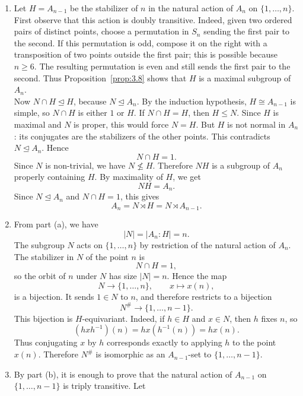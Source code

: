 \documentclass[../Odyssey_Project.tex]{subfiles}
\begin{document}
\begin{solution}
    \phantom{}\par
    \begin{enumerate}
        \item[(a)] Let $H=A_{n-1}$ be the stabilizer of $n$ in the natural action of $A_n$ on $\{1,\ldots,n\}$. First observe that this action is doubly transitive. Indeed, given two ordered pairs of distinct points, choose a permutation in $S_n$ sending the first pair to the second. If this permutation is odd, compose it on the right with a transposition of two points outside the first pair; this is possible because $n\geq 6$. The resulting permutation is even and still sends the first pair to the second. Thus Proposition~\ref{prop:3.8} shows that $H$ is a maximal subgroup of $A_n$.\\
        Now $N\cap H\trianglelefteq H$, because $N\trianglelefteq A_n$. By the induction hypothesis, $H\cong A_{n-1}$ is simple, so $N\cap H$ is either $1$ or $H$. If $N\cap H=H$, then $H\leq N$. Since $H$ is maximal and $N$ is proper, this would force $N=H$. But $H$ is not normal in $A_n$: its conjugates are the stabilizers of the other points. This contradicts $N\trianglelefteq A_n$. Hence
        \[
            N\cap H=1.
        \]
        Since $N$ is non-trivial, we have $N\nleq H$. Therefore $NH$ is a subgroup of $A_n$ properly containing $H$. By maximality of $H$, we get
        \[
            NH=A_n.
        \]
        Since $N\trianglelefteq A_n$ and $N\cap H=1$, this gives
        \[
            A_n=N\rtimes H=N\rtimes A_{n-1}.
        \]
        \item[(b)] From part (a), we have
        \[
            |N|=|A_n:H|=n.
        \]
        The subgroup $N$ acts on $\{1,\ldots,n\}$ by restriction of the natural action of $A_n$. The stabilizer in $N$ of the point $n$ is
        \[
            N\cap H=1,
        \]
        so the orbit of $n$ under $N$ has size $|N|=n$. Hence the map
        \[
            N\to \{1,\ldots,n\},\qquad x\mapsto x(n),
        \]
        is a bijection. It sends $1\in N$ to $n$, and therefore restricts to a bijection
        \[
            N^{\#}\to \{1,\ldots,n-1\}.
        \]
        This bijection is $H$-equivariant. Indeed, if $h\in H$ and $x\in N$, then $h$ fixes $n$, so
        \[
            (hxh^{-1})(n)=h x(h^{-1}(n))=h x(n).
        \]
        Thus conjugating $x$ by $h$ corresponds exactly to applying $h$ to the point $x(n)$. Therefore $N^{\#}$ is isomorphic as an $A_{n-1}$-set to $\{1,\ldots,n-1\}$.
        \item[(c)] By part (b), it is enough to prove that the natural action of $A_{n-1}$ on $\{1,\ldots,n-1\}$ is triply transitive. Let

\end{enumerate}
\end{solution}
\end{document}
